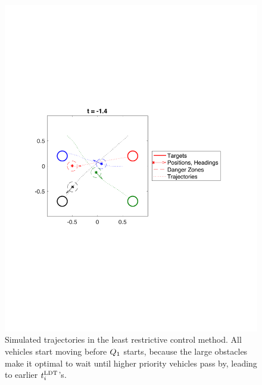 \begin{figure}
  \centering
  \includegraphics[width=\columnwidth]{"fig/lrc_traj"}
  \caption{Simulated trajectories in the least restrictive control method. All vehicles start moving before $Q_1$ starts, because the large obstacles make it optimal to wait until higher priority vehicles pass by, leading to earlier $t^\text{LDT}_i$'s. }
  \label{fig:lrc_traj}
\end{figure}

